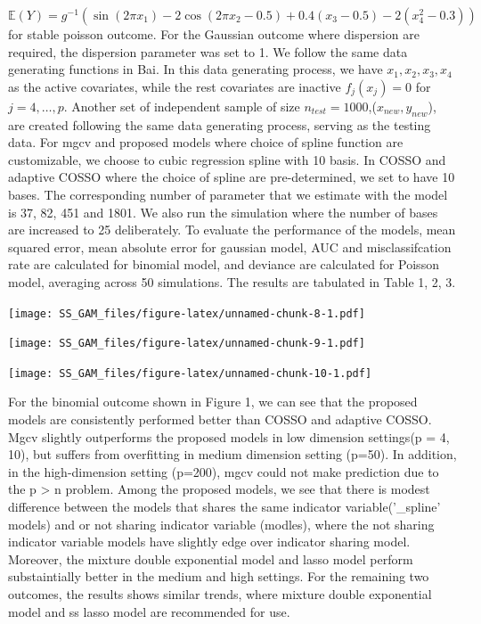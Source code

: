 \documentclass[AMA,STIX1COL,]{WileyNJD-v2}
\begin{document}
\[
\mathbb{E}(Y) = g^{-1}(\sin(2\pi x_1) - 2\cos(2\pi x_2 -0.5) + 0.4(x_3-0.5) - 2(x_4^2 -0.3))
\] for stable poisson outcome. For the Gaussian outcome where dispersion
are required, the dispersion parameter was set to 1. We follow the same
data generating functions in Bai. In this data generating process, we
have \(x_1, x_2, x_3, x_4\) as the active covariates, while the rest
covariates are inactive \(f_j(x_j) = 0\) for \(j = 4, \dots, p\).
Another set of independent sample of size
\(n_{test}=1000\),(\(x_{new} ,y_{new}\)), are created following the same
data generating process, serving as the testing data. For mgcv and
proposed models where choice of spline function are customizable, we
choose to cubic regression spline with 10 basis. In COSSO and adaptive
COSSO where the choice of spline are pre-determined, we set to have 10
bases. The corresponding number of parameter that we estimate with the
model is 37, 82, 451 and 1801. We also run the simulation where the
number of bases are increased to 25 deliberately. To evaluate the
performance of the models, mean squared error, mean absolute error for
gaussian model, AUC and misclassifcation rate are calculated for
binomial model, and deviance are calculated for Poisson model, averaging
across 50 simulations. The results are tabulated in Table 1, 2, 3.

\texttt{[image: SS\_GAM\_files/figure-latex/unnamed-chunk-8-1.pdf]}

\texttt{[image: SS\_GAM\_files/figure-latex/unnamed-chunk-9-1.pdf]}

\texttt{[image: SS\_GAM\_files/figure-latex/unnamed-chunk-10-1.pdf]}

For the binomial outcome shown in Figure 1, we can see that the proposed
models are consistently performed better than COSSO and adaptive COSSO.
Mgcv slightly outperforms the proposed models in low dimension
settings(p = 4, 10), but suffers from overfitting in medium dimension
setting (p=50). In addition, in the high-dimension setting (p=200), mgcv
could not make prediction due to the p \textgreater{} n problem. Among
the proposed models, we see that there is modest difference between the
models that shares the same indicator variable('\_spline' models) and or
not sharing indicator variable (modles), where the not sharing indicator
variable models have slightly edge over indicator sharing model.
Moreover, the mixture double exponential model and lasso model perform
substaintially better in the medium and high settings. For the remaining
two outcomes, the results shows similar trends, where mixture double
exponential model and ss lasso model are recommended for use.
\end{document}
